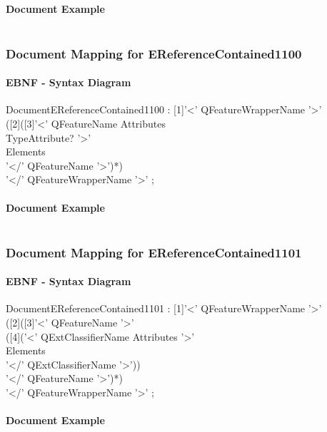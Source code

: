 \documentclass[11pt,a4paper]{article}
\begin{document}
\paragraph{Document Example}
\inputminted[fontsize=\footnotesize]{xml}{examples/EReferenceContained1011.xml}

\subsubsection{Document Mapping for EReferenceContained1100}
\paragraph{EBNF - Syntax Diagram}
\begin{rail}
DocumentEReferenceContained1100 : [1]'<' QFeatureWrapperName '>' \\
([2]([3]'<' QFeatureName Attributes \\
TypeAttribute? '>'  \\
Elements \\
'</' QFeatureName '>')*) \\
'</' QFeatureWrapperName '>' ;
\end{rail}
\paragraph{Document Example}
\inputminted[fontsize=\footnotesize]{xml}{examples/EReferenceContained1100.xml}

\subsubsection{Document Mapping for EReferenceContained1101}
\paragraph{EBNF - Syntax Diagram}
\begin{rail}
DocumentEReferenceContained1101 : [1]'<' QFeatureWrapperName '>' \\
([2]([3]'<' QFeatureName '>' \\
([4]('<' QExtClassifierName  Attributes '>' \\
Elements \\
'</' QExtClassifierName  '>')) \\
'</' QFeatureName '>')*) \\
'</' QFeatureWrapperName '>' ;
\end{rail}
\paragraph{Document Example}
\inputminted[fontsize=\footnotesize]{xml}{examples/EReferenceContained1101.xml}
\end{document}
